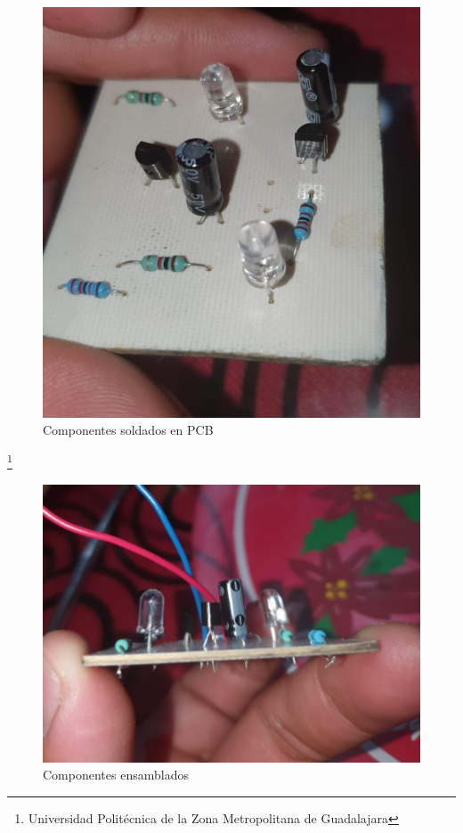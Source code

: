 \documentclass[11pt,a4paper]{article}
\begin{document}
\begin{figure}[hbtp]
\centering
\includegraphics[scale=0.4]{Pictures/PCB3.jpeg}
\caption{Componentes soldados en PCB}
\end{figure}
\footnote{Universidad Politécnica de la Zona Metropolitana de Guadalajara}

\newpage
\begin{figure}[hbtp]
\centering
\includegraphics[scale=0.4]{Pictures/PCB4.jpeg}
\caption{Componentes ensamblados}
\end{figure}
\end{document}
